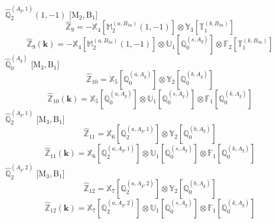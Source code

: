 \documentclass[fleqn,10pt,landscape]{article}
\begin{document}
\begin{itemize}
\vspace{4mm}
\noindent {} $\,\,\,\hat{\mathbb{Q}}_{2}^{(A_{g},1)}(1,-1)$ [M$_{2}$,\,B$_{1}$]
\begin{dmath*}
\hat{\mathbb{Z}}_{9}=- \mathbb{X}_{4}[\mathbb{M}_{2}^{(a,B_{3u})}(1,-1)] \otimes\mathbb{Y}_{3}[\mathbb{T}_{1}^{(b,B_{3u})}]
\end{dmath*}
\begin{dmath*}
\hat{\mathbb{Z}}_{9}(\bm{k})=- \mathbb{X}_{4}[\mathbb{M}_{2}^{(a,B_{3u})}(1,-1)] \otimes\mathbb{U}_{1}[\mathbb{Q}_{0}^{(s,A_{g})}] \otimes\mathbb{F}_{2}[\mathbb{T}_{1}^{(k,B_{3u})}]
\end{dmath*}
\vspace{4mm}
\noindent {} $\,\,\,\hat{\mathbb{Q}}_{0}^{(A_{g})}$ [M$_{3}$,\,B$_{1}$]
\begin{dmath*}
\hat{\mathbb{Z}}_{10}=\mathbb{X}_{5}[\mathbb{Q}_{0}^{(a,A_{g})}] \otimes\mathbb{Y}_{2}[\mathbb{Q}_{0}^{(b,A_{g})}]
\end{dmath*}
\begin{dmath*}
\hat{\mathbb{Z}}_{10}(\bm{k})=\mathbb{X}_{5}[\mathbb{Q}_{0}^{(a,A_{g})}] \otimes\mathbb{U}_{1}[\mathbb{Q}_{0}^{(s,A_{g})}] \otimes\mathbb{F}_{1}[\mathbb{Q}_{0}^{(k,A_{g})}]
\end{dmath*}
\vspace{4mm}
\noindent {} $\,\,\,\hat{\mathbb{Q}}_{2}^{(A_{g},1)}$ [M$_{3}$,\,B$_{1}$]
\begin{dmath*}
\hat{\mathbb{Z}}_{11}=\mathbb{X}_{6}[\mathbb{Q}_{2}^{(a,A_{g},1)}] \otimes\mathbb{Y}_{2}[\mathbb{Q}_{0}^{(b,A_{g})}]
\end{dmath*}
\begin{dmath*}
\hat{\mathbb{Z}}_{11}(\bm{k})=\mathbb{X}_{6}[\mathbb{Q}_{2}^{(a,A_{g},1)}] \otimes\mathbb{U}_{1}[\mathbb{Q}_{0}^{(s,A_{g})}] \otimes\mathbb{F}_{1}[\mathbb{Q}_{0}^{(k,A_{g})}]
\end{dmath*}
\vspace{4mm}
\noindent {} $\,\,\,\hat{\mathbb{Q}}_{2}^{(A_{g},2)}$ [M$_{3}$,\,B$_{1}$]
\begin{dmath*}
\hat{\mathbb{Z}}_{12}=\mathbb{X}_{7}[\mathbb{Q}_{2}^{(a,A_{g},2)}] \otimes\mathbb{Y}_{2}[\mathbb{Q}_{0}^{(b,A_{g})}]
\end{dmath*}
\begin{dmath*}
\hat{\mathbb{Z}}_{12}(\bm{k})=\mathbb{X}_{7}[\mathbb{Q}_{2}^{(a,A_{g},2)}] \otimes\mathbb{U}_{1}[\mathbb{Q}_{0}^{(s,A_{g})}] \otimes\mathbb{F}_{1}[\mathbb{Q}_{0}^{(k,A_{g})}]
\end{dmath*}

\end{itemize}
\end{document}
